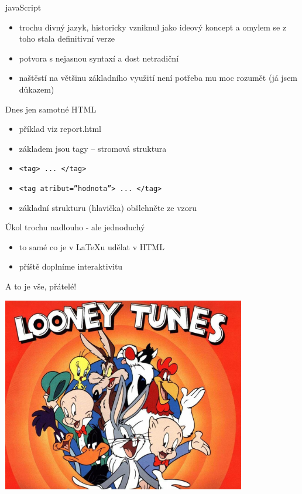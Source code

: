\documentclass{beamer}
\begin{document}
\begin{frame}{javaScript}
  \begin{itemize}
    \item trochu divný jazyk, historicky vzniknul jako ideový koncept a omylem se z toho stala definitivní verze
    \item potvora s nejasnou syntaxí a dost netradiční
    \item naštěstí na většinu základního využití není potřeba mu moc rozumět (já jsem důkazem)
  \end{itemize}
\end{frame}

\begin{frame}{Dnes jen samotné HTML}
  \begin{itemize}
    \item příklad viz report.html
    \item základem jsou tagy -- stromová struktura
    \item \texttt{<tag> ... </tag>}
    \item \texttt{<tag atribut=''hodnota''> ... </tag>}
    \item základní strukturu (hlavička) obšlehněte ze vzoru
  \end{itemize}
\end{frame}

\begin{frame}{Úkol trochu nadlouho - ale jednoduchý}
  \begin{itemize}
    \item to samé co je v LaTeXu udělat v HTML
    \item příště doplníme interaktivitu
  \end{itemize}
\end{frame}

\begin{frame}{A to je vše, přátelé!}
  \begin{center}
    \includegraphics[width=0.8\textwidth]{looney_tunes}
  \end{center}
\end{frame}
\end{document}
